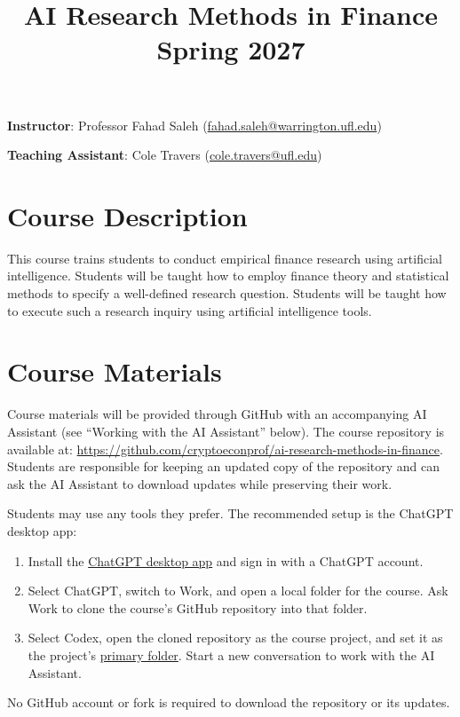 \documentclass[11pt]{article}
\title{AI Research Methods in Finance\\
\smallskip
\normalsize Spring 2027}
\author{}
\date{}
\begin{document}
\maketitle
\vspace{-12mm}

\noindent\textbf{Instructor}: Professor Fahad Saleh (\url{fahad.saleh@warrington.ufl.edu})

\noindent\textbf{Teaching Assistant}: Cole Travers (\url{cole.travers@ufl.edu})

\section*{Course Description}
This course trains students to conduct empirical finance research using artificial
intelligence. Students will be taught how to employ finance theory and statistical
methods to specify a well-defined research question. Students will be taught how
to execute such a research inquiry using artificial intelligence tools.

\section*{Course Materials}
Course materials will be provided through GitHub with an accompanying AI Assistant
(see ``Working with the AI Assistant'' below). The course repository is available at:
\url{https://github.com/cryptoeconprof/ai-research-methods-in-finance}.
Students are responsible for keeping an updated copy of the repository and can
ask the AI Assistant to download updates while preserving their work.

Students may use any tools they prefer. The recommended setup is the ChatGPT
desktop app:
\begin{enumerate}
\item Install the \href{https://learn.chatgpt.com/docs/app}{ChatGPT desktop app}
and sign in with a ChatGPT account.
\item Select ChatGPT, switch to Work, and open a local folder for the course.
Ask Work to clone the course's GitHub repository into that folder.
\item Select Codex, open the cloned repository as the course project, and set it
as the project's \href{https://learn.chatgpt.com/docs/projects#use-local-projects-for-folders-and-codebases}{primary folder}.
Start a new conversation to work with the AI Assistant.
\end{enumerate}
No GitHub account or fork is required to download the repository or its updates.
\end{document}
